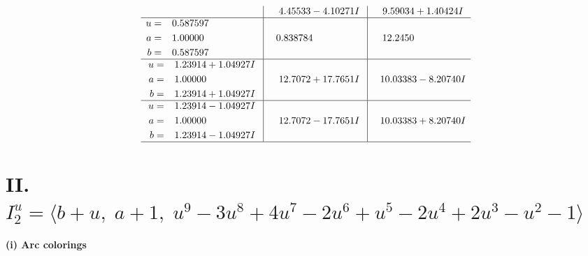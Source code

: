 \documentclass[1p]{elsarticle_modified}
\theoremstyle{definition}
\begin{document}
$$\begin{array}{c|c|c}
 & \phantom{-}4.45533 - 4.10271 I & \phantom{-}9.59034 + 1.40424 I \\ \hline\begin{aligned}
u &= \phantom{-}0.587597\phantom{ +0.000000I} \\
a &= \phantom{-}1.00000\phantom{ +0.000000I} \\
b &= \phantom{-}0.587597\phantom{ +0.000000I}\end{aligned}
 & \phantom{-}0.838784\phantom{ +0.000000I} & \phantom{-}12.2450\phantom{ +0.000000I} \\ \hline\begin{aligned}
u &= \phantom{-}1.23914 + 1.04927 I \\
a &= \phantom{-}1.00000\phantom{ +0.000000I} \\
b &= \phantom{-}1.23914 + 1.04927 I\end{aligned}
 & \phantom{-}12.7072 + 17.7651 I & \phantom{-}10.03383 - 8.20740 I \\ \hline\begin{aligned}
u &= \phantom{-}1.23914 - 1.04927 I \\
a &= \phantom{-}1.00000\phantom{ +0.000000I} \\
b &= \phantom{-}1.23914 - 1.04927 I\end{aligned}
 & \phantom{-}12.7072 - 17.7651 I & \phantom{-}10.03383 + 8.20740 I\\
 \hline 
 \end{array}$$\newpage\newpage\renewcommand{\arraystretch}{1}
\centering \section*{II. $I^u_{2}= \langle b+u,\;a+1,\;u^9-3 u^8+4 u^7-2 u^6+u^5-2 u^4+2 u^3- u^2-1 \rangle$}
\flushleft \textbf{(i) Arc colorings}\\
\end{document}
